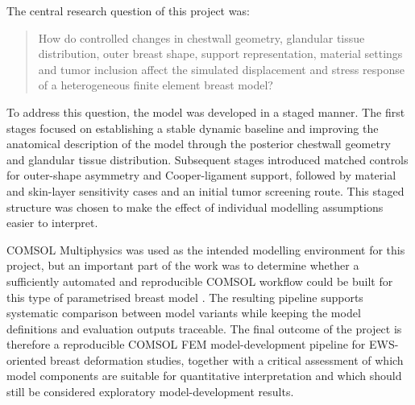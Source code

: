 The central research question of this project was:

\begin{quote}
How do controlled changes in chestwall geometry, glandular tissue distribution, outer breast shape, support representation, material settings and tumor inclusion affect the simulated displacement and stress response of a heterogeneous finite element breast model?
\end{quote}

To address this question, the model was developed in a staged manner. The first stages focused on establishing a stable dynamic baseline and improving the anatomical description of the model through the posterior chestwall geometry and glandular tissue distribution. Subsequent stages introduced matched controls for outer-shape asymmetry and Cooper-ligament support, followed by material and skin-layer sensitivity cases and an initial tumor screening route. This staged structure was chosen to make the effect of individual modelling assumptions easier to interpret.

COMSOL Multiphysics was used as the intended modelling environment for this project, but an important part of the work was to determine whether a sufficiently automated and reproducible COMSOL workflow could be built for this type of parametrised breast model \cite{COMSOLMultiphysicsWebsite}. The resulting pipeline supports systematic comparison between model variants while keeping the model definitions and evaluation outputs traceable. The final outcome of the project is therefore a reproducible COMSOL FEM model-development pipeline for EWS-oriented breast deformation studies, together with a critical assessment of which model components are suitable for quantitative interpretation and which should still be considered exploratory model-development results.


